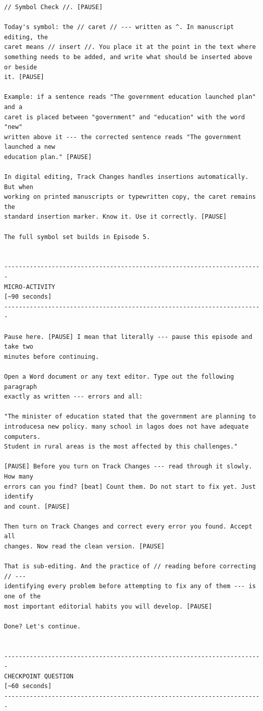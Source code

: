 {\begin{Verbatim}
// Symbol Check //. [PAUSE]

Today's symbol: the // caret // --- written as ^. In manuscript editing, the
caret means // insert //. You place it at the point in the text where
something needs to be added, and write what should be inserted above or beside
it. [PAUSE]

Example: if a sentence reads "The government education launched plan" and a
caret is placed between "government" and "education" with the word "new"
written above it --- the corrected sentence reads "The government launched a new
education plan." [PAUSE]

In digital editing, Track Changes handles insertions automatically. But when
working on printed manuscripts or typewritten copy, the caret remains the
standard insertion marker. Know it. Use it correctly. [PAUSE]

The full symbol set builds in Episode 5.


-----------------------------------------------------------------------
MICRO-ACTIVITY
[~90 seconds]
-----------------------------------------------------------------------

Pause here. [PAUSE] I mean that literally --- pause this episode and take two
minutes before continuing.

Open a Word document or any text editor. Type out the following paragraph
exactly as written --- errors and all:

"The minister of education stated that the government are planning to
introducesa new policy. many school in lagos does not have adequate computers.
Student in rural areas is the most affected by this challenges."

[PAUSE] Before you turn on Track Changes --- read through it slowly. How many
errors can you find? [beat] Count them. Do not start to fix yet. Just identify
and count. [PAUSE]

Then turn on Track Changes and correct every error you found. Accept all
changes. Now read the clean version. [PAUSE]

That is sub-editing. And the practice of // reading before correcting // ---
identifying every problem before attempting to fix any of them --- is one of the
most important editorial habits you will develop. [PAUSE]

Done? Let's continue.


-----------------------------------------------------------------------
CHECKPOINT QUESTION
[~60 seconds]
-----------------------------------------------------------------------


\end{Verbatim}}
